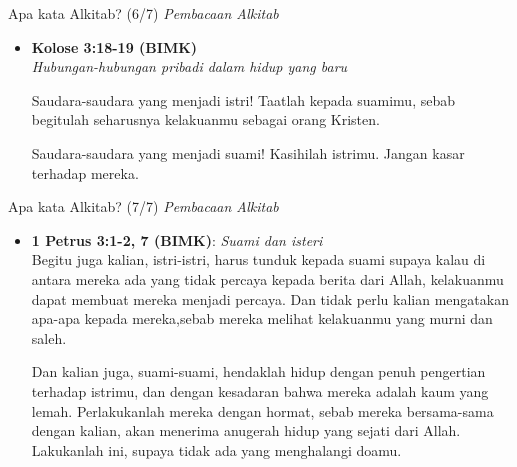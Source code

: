 \documentclass[10pt,svgnames]{beamer} %
\begin{document}
\begin{frame}{Apa kata Alkitab? (6/7)}
 	\emph{Pembacaan Alkitab}
	\begin{itemize}
		\item<2-> \textbf{Kolose 3:18-19 (BIMK)} \\
		\onslide<3-> \textit{Hubungan-hubungan pribadi dalam hidup yang baru}
				
		\bigskip
		
		 Saudara-saudara yang menjadi istri! \onslide<5->Taatlah kepada suamimu, sebab begitulah seharusnya kelakuanmu sebagai orang Kristen. 
		
		\bigskip
		Saudara-saudara yang menjadi suami! \onslide<7->Kasihilah istrimu. Jangan kasar terhadap mereka.
	\end{itemize}
\end{frame}

\begin{frame}{Apa kata Alkitab? (7/7)}
 	\emph{Pembacaan Alkitab}
	\begin{itemize}
		\item<2-> \textbf{1 Petrus 3:1-2, 7 (BIMK)}: \textit{Suami dan isteri} \\
		\onslide<3-> Begitu juga kalian, istri-istri, harus tunduk kepada suami supaya kalau di antara mereka ada yang tidak percaya kepada berita dari Allah, kelakuanmu dapat membuat mereka menjadi percaya. \onslide<4-> Dan tidak perlu kalian mengatakan apa-apa kepada mereka,sebab mereka melihat kelakuanmu yang murni dan saleh.

		\bigskip
		 Dan kalian juga, suami-suami, hendaklah hidup dengan penuh pengertian terhadap istrimu, dan dengan kesadaran bahwa mereka adalah kaum yang lemah. \onslide<6-> Perlakukanlah mereka dengan hormat, sebab mereka bersama-sama dengan kalian, akan menerima anugerah hidup yang sejati dari Allah. \onslide<7->Lakukanlah ini, supaya tidak ada yang menghalangi doamu. 
	\end{itemize}
\end{frame}
\end{document}
